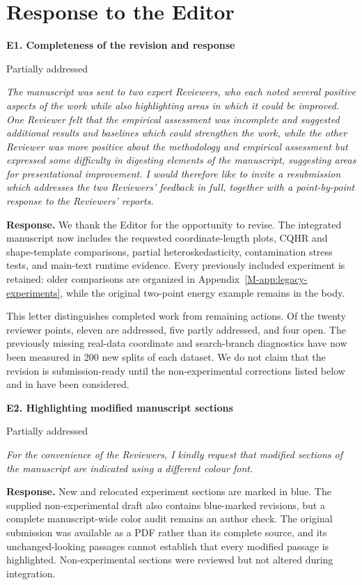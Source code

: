 \documentclass[11pt]{article}
\newcommand{\msapp}[1]{Appendix~\ref*{M-#1}}
\newcommand{\point}[3]{\par\Needspace{7\baselineskip}\medskip
\noindent\parbox[t]{0.77\linewidth}{\textbf{#1}}\hfill
\parbox[t]{0.21\linewidth}{\raggedleft\small\sffamily #2}\par\nopagebreak
{\color{ReviewerBlue}\small\itshape #3\par}\textbf{Response.} }
\begin{document}
\clearpage
\section*{Response to the Editor}

\point{E1. Completeness of the revision and response}{Partially addressed}{The manuscript was sent to two expert Reviewers, who each noted several
positive aspects of the work while also highlighting areas in which it
could be improved. One Reviewer felt that the empirical assessment was
incomplete and suggested additional results and baselines which could
strengthen the work, while the other Reviewer was more positive about the
methodology and empirical assessment but expressed some difficulty in
digesting elements of the manuscript, suggesting areas for presentational
improvement. I would therefore like to invite a resubmission which
addresses the two Reviewers' feedback in full, together with a
point-by-point response to the Reviewers' reports.}
\label{response:E1}
We thank the Editor for the opportunity to revise. The integrated manuscript now includes the requested coordinate-length plots, CQHR and shape-template comparisons, partial heteroskedasticity, contamination stress tests, and main-text runtime evidence. Every previously included experiment is retained: older comparisons are organized in \msapp{app:legacy-experiments}, while the original two-point energy example remains in the body.

This letter distinguishes completed work from remaining actions. Of the twenty reviewer points, eleven are addressed, five partly addressed, and four open. The previously missing real-data coordinate and search-branch diagnostics have now been measured in 200 new splits of each dataset. We do not claim that the revision is submission-ready until the non-experimental corrections listed below and in  have been considered.

\point{E2. Highlighting modified manuscript sections}{Partially addressed}{For the convenience of the Reviewers, I kindly request that modified
sections of the manuscript are indicated using a different colour font.}
\label{response:E2}
New and relocated experiment sections are marked in blue. The supplied non-experimental draft also contains blue-marked revisions, but a complete manuscript-wide color audit remains an author check. The original submission was available as a PDF rather than its complete source, and its unchanged-looking passages cannot establish that every modified passage is highlighted. Non-experimental sections were reviewed but not altered during integration.
\end{document}
